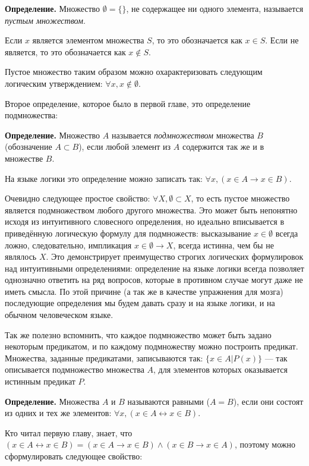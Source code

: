 {\bfseries Определение.} Множество $\emptyset=\{\}$, не содержащее ни одного элемента, называется {\slshape пустым множеством}.

Если $x$ является элементом множества $S$, то это обозначается как $x \in S$. Если не является, то это обозначается как $x \not\in S$.

Пустое множество таким образом можно охарактеризовать следующим логическим утверждением: $\forall x, x \not \in \emptyset$.

Второе определение, которое было в первой главе, это определение подмножества:

{\bfseries Определение.} Множество $A$ называется {\slshape подмножеством} множества $B$ (обозначение $A\subset B$), если любой элемент из $A$ содержится так же и в множестве $B$.

На языке логики это определение можно записать так: $\forall x, (x\in A\rightarrow x\in B)$.

Очевидно следующее простое свойство: $\forall X, \emptyset\subset X$, то есть пустое множество является подмножеством любого другого множества. Это может быть непонятно исходя из интуитивного словесного определения, но идеально вписывается в приведённую логическую формулу для подмножеств: высказывание $x\in\emptyset$ всегда ложно, следовательно, импликация $x\in\emptyset \rightarrow X$, всегда истинна, чем бы не являлось $X$. Это демонстрирует преимущество строгих логических формулировок над интуитивными определениями: определение на языке логики всегда позволяет однозначно ответить на ряд вопросов, которые в противном случае могут даже не иметь смысла. По этой причине (а так же в качестве упражнения для мозга) последующие определения мы будем давать сразу и на языке логики, и на обычном человеческом языке.

Так же полезно вспомнить, что каждое подмножество может быть задано некоторым предикатом, и по каждому подмножеству можно построить предикат. Множества, заданные предикатами, записываются так: $\{x \in A|P(x)\}$ — так описывается подмножество множества $A$, для элементов которых оказывается истинным предикат $P$.

{\bfseries Определение.} Множества $A$ и $B$ называются равными ($A=B$), если они состоят из одних и тех же элементов: $\forall x, (x\in A \leftrightarrow x\in B)$.

Кто читал первую главу, знает, что $(x\in A \leftrightarrow x\in B) = (x \in A \rightarrow x \in B) \wedge (x \in B \rightarrow x \in A)$, поэтому можно сформулировать следующее свойство:

